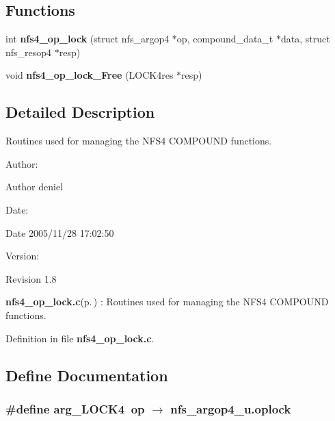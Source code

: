 \subsection*{Functions}
\begin{CompactItemize}
\item 
int {\bf nfs4\_\-op\_\-lock} (struct nfs\_\-argop4 $\ast$op, compound\_\-data\_\-t $\ast$data, struct nfs\_\-resop4 $\ast$resp)
\item 
void {\bf nfs4\_\-op\_\-lock\_\-Free} (LOCK4res $\ast$resp)
\end{CompactItemize}


\subsection{Detailed Description}
Routines used for managing the NFS4 COMPOUND functions. 

\begin{Desc}
\item[Author:]\begin{Desc}
\item[Author]deniel \end{Desc}
\end{Desc}
\begin{Desc}
\item[Date:]\begin{Desc}
\item[Date]2005/11/28 17:02:50 \end{Desc}
\end{Desc}
\begin{Desc}
\item[Version:]\begin{Desc}
\item[Revision]1.8 \end{Desc}
\end{Desc}
{\bf nfs4\_\-op\_\-lock.c}{\rm (p.\,\pageref{nfs4__op__lock_8c})} : Routines used for managing the NFS4 COMPOUND functions.

Definition in file {\bf nfs4\_\-op\_\-lock.c}.

\subsection{Define Documentation}
\subsubsection{\setlength{\rightskip}{0pt plus 5cm}\#define arg\_\-LOCK4\ op $\rightarrow$ nfs\_\-argop4\_\-u.oplock}\label{nfs4__op__lock_8c_a0}


